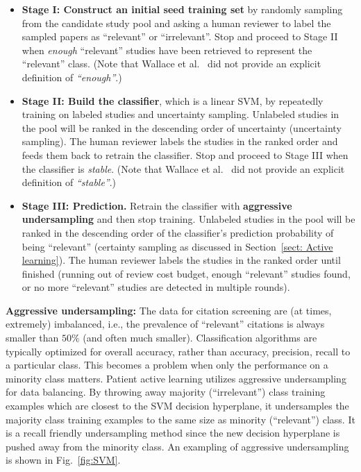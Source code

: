 \documentclass{svjour3}
\theoremstyle{break}
\begin{document}
\begin{itemize}

\item
{\bf Stage I: Construct an initial seed training set} by randomly sampling from the candidate study pool and asking a human reviewer to label the sampled papers as ``relevant'' or ``irrelevant''. Stop and proceed to Stage II when \textit{enough} ``relevant'' studies have been retrieved to represent the ``relevant'' class. (Note that Wallace et al.~\cite{wallace2010semi} did not provide an explicit definition of \textit{``enough''}.)

\item
{\bf Stage II: Build the classifier}, which is a linear SVM, by repeatedly training on labeled studies and uncertainty sampling. Unlabeled studies in the pool will be ranked in the descending order of uncertainty (uncertainty sampling). The human reviewer labels the studies in the ranked order and feeds them back to retrain the classifier. Stop and proceed to Stage III when the classifier is \textit{stable}. (Note that Wallace et al.~\cite{wallace2010semi} did not provide an explicit definition of \textit{``stable''}.)

\item
{\bf Stage III: Prediction.} Retrain the classifier with \textbf{aggressive undersampling} and then stop training. Unlabeled studies in the pool will be ranked in the descending order of the classifier's prediction probability of being ``relevant'' (certainty sampling as discussed in Section~\ref{sect: Active learning}). The human reviewer labels the studies in the ranked order until finished (running out of review cost budget, enough ``relevant'' studies found, or no more ``relevant'' studies are detected in multiple rounds).

\end{itemize}

{\bf Aggressive undersampling: }The data for citation screening are (at times, extremely) imbalanced, i.e., the prevalence of ``relevant'' citations is always smaller than $50\%$ (and often much smaller). Classification algorithms are typically optimized for overall accuracy, rather than accuracy, precision, recall to a particular class. This becomes a problem when only the performance on a minority class matters. Patient active learning utilizes aggressive undersampling for data balancing. By throwing away majority (``irrelevant'') class training examples which are closest to the SVM decision hyperplane, it undersamples the majority class training examples to the same size as minority (``relevant'') class. It is a recall friendly undersampling method since the new decision hyperplane is pushed away from the minority class. An exampling of aggressive undersampling is shown in Fig.~\ref{fig:SVM}.
\end{document}
